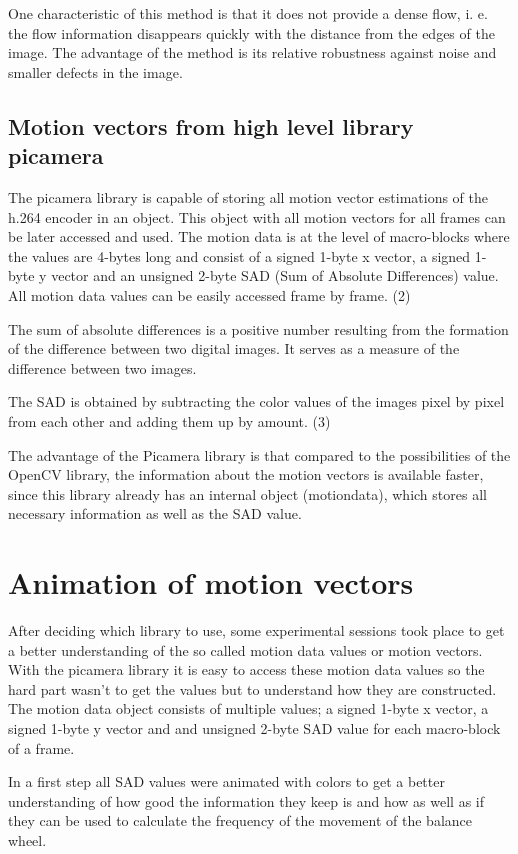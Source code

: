 \documentclass[12pt, a4paper]{report}
\begin{document}
    One characteristic of this method is that it does not provide a dense flow, i. e. the flow information disappears quickly with the distance from the edges of the image. The advantage of the method is its relative robustness against noise and smaller defects in the image.
    
    \subsection{Motion vectors from high level library picamera}
    The picamera library is capable of storing all motion vector estimations of the h.264 encoder in an object. This object with all motion vectors for all frames can be later accessed and used. The motion data is at the level of macro-blocks where the values are 4-bytes long and consist of a signed 1-byte x vector, a signed 1-byte y vector and an unsigned 2-byte SAD (Sum of Absolute Differences) value. All motion data values can be easily accessed frame by frame. (2) 
    
    The sum of absolute differences is a positive number resulting from the formation of the difference between two digital images. It serves as a measure of the difference between two images.
    
    The SAD is obtained by subtracting the color values of the images pixel by pixel from each other and adding them up by amount. (3)
    
    The advantage of the Picamera library is that compared to the possibilities of the OpenCV library, the information about the motion vectors is available faster, since this library already has an internal object (motiondata), which stores all necessary information as well as the SAD value. 
    
    \section{Animation of motion vectors}
    After deciding which library to use, some experimental sessions took place to get a better understanding of the so called motion data values or motion vectors. 
    With the picamera library it is easy to access these motion data values so the hard part wasn't to get the values but to understand how they are constructed. 
    The motion data object consists of multiple values; a signed 1-byte x vector, a signed 1-byte y vector and and unsigned 2-byte SAD value for each macro-block of a frame.
    
    In a first step all SAD values were animated with colors to get a better understanding of how good the information they keep is and how as well as if they can be used to calculate the frequency of the movement of the balance wheel.
    
\end{document}
